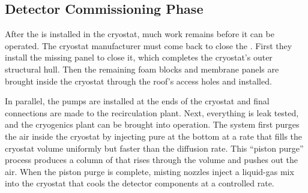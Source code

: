 \subsection{Detector Commissioning Phase}
\label{sec:fdsp-tc-inst-comiss}
After the  is installed in the cryostat, much work remains before it can be operated. 
The cryostat manufacturer must come back to close the . 
First they install the missing panel %
to close it, which completes the cryostat's outer structural hull.   
Then the remaining foam blocks and membrane panels
are brought inside the cryostat  through the roof's access holes and installed. 


In parallel, the \lar pumps are installed at the ends of the cryostat and final connections are made to the recirculation plant. Next, everything is leak tested, and the cryogenics plant can be brought into operation. The system first purges the air inside the cryostat  by injecting pure  at the bottom  at a rate that fills the cryostat volume uniformly but faster than the diffusion rate. This ``piston purge'' process produces a column of   that rises through the volume and pushes out the air.  When the piston purge is complete, misting nozzles inject a liquid-gas mix into the cryostat that cools the detector components at a controlled rate. 

